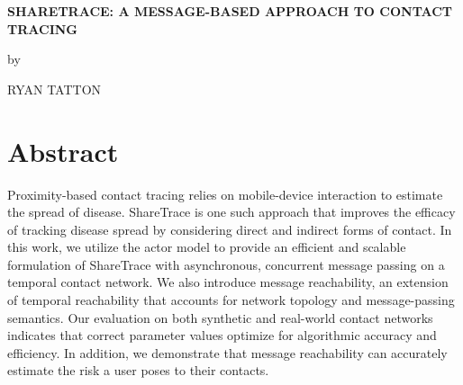 \begin{center}
\large

\textsc{\textbf{SHARETRACE: A MESSAGE-BASED APPROACH TO CONTACT TRACING}}

\vspace{0.1in}

\normalsize

by

\vspace{0.1in}

\large

RYAN TATTON
\end{center}

\section*{Abstract} %
Proximity-based contact tracing relies on mobile-device interaction to estimate the spread of disease. ShareTrace is one such approach that improves the efficacy of tracking disease spread by considering direct and indirect forms of contact. In this work, we utilize the actor model to provide an efficient and scalable formulation of ShareTrace with asynchronous, concurrent message passing on a temporal contact network. We also introduce message reachability, an extension of temporal reachability that accounts for network topology and message-passing semantics. Our evaluation on both synthetic and real-world contact networks indicates that correct parameter values optimize for algorithmic accuracy and efficiency. In addition, we demonstrate that message reachability can accurately estimate the risk a user poses to their contacts.
\clearpage